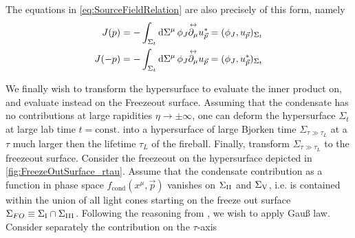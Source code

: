 The equations in \eqref{eq:SourceFieldRelation} are also precisely of this form, namely
\begin{subequations}
    \begin{align}
        J(p)&=-\int_{\Sigma_t}\text{d}\Sigma^\mu\,\phi_J\overset{\leftrightarrow}{\partial_\mu}u_{\vec{p}}^*=(\phi_J,u_{\vec{p}})_{\Sigma_t}\\
        J(-p)&=-\int_{\Sigma_t}\text{d}\Sigma^\mu\,\phi_J\overset{\leftrightarrow}{\partial_\mu}u_{\vec{p}}=(\phi_J,u_{\vec{p}}^*)_{\Sigma_t}
    \end{align}
\end{subequations}

We finally wish to transform the hypersurface to evaluate the inner product on, and evaluate instead on the Freezeout surface. Assuming that the condensate has no contributions at large rapidities $\eta\to\pm\infty$, one can deform the hypersurface $\Sigma_t$ at large lab time $t=\text{const.}$ into a hypersurface of large Bjorken time $\Sigma_{\tau\gg\tau_L}$ at a $\tau$ much larger then the lifetime $\tau_L$ of the fireball. Finally, transform $\Sigma_{\tau\gg\tau_L}$ to the freezeout surface.
Consider the freezeout on the hypersurface depicted in \ref{fig:FreezeOutSurface_rtau}. Assume that the condensate contribution as a function in phase space $f_{\text{cond}}(x^\mu,\vec{p})$ vanishes on $\Sigma_{\text{\rom{2}}}$ and $\Sigma_{\text{\rom{5}}}$, i.e. is contained within the union of all light cones starting on the freeze out surface $\Sigma_{FO}\equiv\Sigma_{\text{\rom{1}}}\cap\Sigma_\text{{\rom{3}}}$.  Following the reasoning from \cite{KirchnerEtAl_2023}, we wish to apply Gauß law. Consider separately the contribution on the $\tau$-axis
